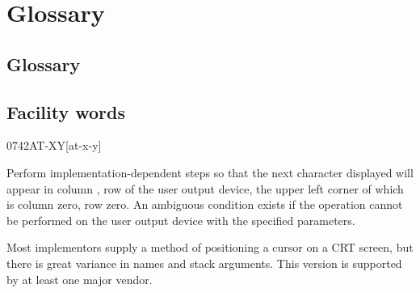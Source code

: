 \section{Glossary} %

\begin{intro}
\subsection{Glossary} %
\end{intro}

\subsection{Facility words} %

\begin{worddef}{0742}{AT-XY}[at-x-y]
\item {}

	Perform implementation-dependent steps so that the next
	character displayed will appear in column , row
	 of the user output device, the upper left corner
	of which is column zero, row zero. An ambiguous condition exists
	if the operation cannot be performed on the user output device
	with the specified parameters.

	\begin{defer}
	\rationale %
		Most implementors supply a method of positioning a cursor on
		a CRT screen, but there is great variance in names and stack
		arguments. This version is supported by at least one major
		vendor.
	\end{defer}
\end{worddef}


